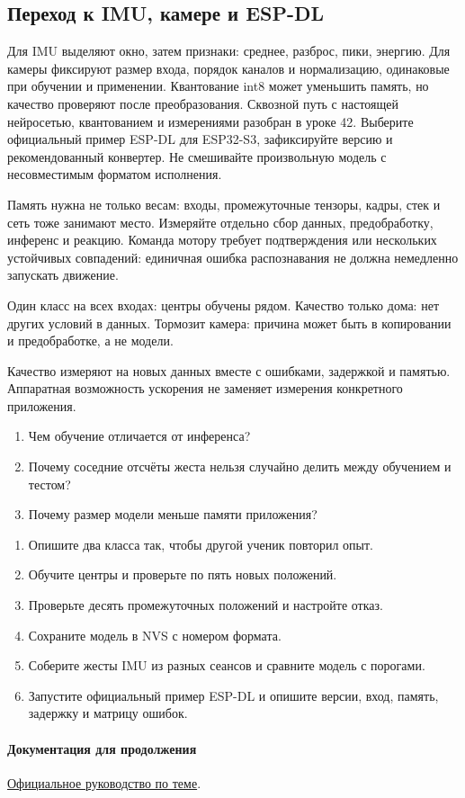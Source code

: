\subsection{Переход к IMU, камере и ESP-DL}
Для IMU выделяют окно, затем признаки: среднее, разброс, пики, энергию.
Для камеры фиксируют размер входа, порядок каналов и нормализацию, одинаковые при обучении
и применении. Квантование int8 может уменьшить память, но качество проверяют после преобразования.
Сквозной путь с настоящей нейросетью, квантованием и измерениями разобран в уроке 42. Выберите официальный пример ESP-DL для ESP32-S3, зафиксируйте версию и рекомендованный конвертер.
Не смешивайте произвольную модель с несовместимым форматом исполнения.

Память нужна не только весам: входы, промежуточные тензоры, кадры, стек и сеть тоже занимают место.
Измеряйте отдельно сбор данных, предобработку, инференс и реакцию.
Команда мотору требует подтверждения или нескольких устойчивых совпадений: единичная ошибка
распознавания не должна немедленно запускать движение.

\begin{trouble}
Один класс на всех входах: центры обучены рядом. Качество только дома: нет других условий в данных.
Тормозит камера: причина может быть в копировании и предобработке, а не модели.
\end{trouble}
\begin{summary}
Качество измеряют на новых данных вместе с ошибками, задержкой и памятью.
Аппаратная возможность ускорения не заменяет измерения конкретного приложения.
\end{summary}

\begin{selfcheck}
\begin{enumerate}
\item Чем обучение отличается от инференса?
\item Почему соседние отсчёты жеста нельзя случайно делить между обучением и тестом?
\item Почему размер модели меньше памяти приложения?
\end{enumerate}
\end{selfcheck}
\begin{tasks}
\begin{enumerate}
\item {} Опишите два класса так, чтобы другой ученик повторил опыт.
\item {} Обучите центры и проверьте по пять новых положений.
\item {} Проверьте десять промежуточных положений и настройте отказ.
\item {} Сохраните модель в NVS с номером формата.
\item {} Соберите жесты IMU из разных сеансов и сравните модель с порогами.
\item {} Запустите официальный пример ESP-DL и опишите версии, вход, память, задержку и матрицу ошибок.
\end{enumerate}
\end{tasks}

\paragraph{Документация для продолжения}\href{https://github.com/espressif/esp-dl}{Официальное руководство по теме}.
